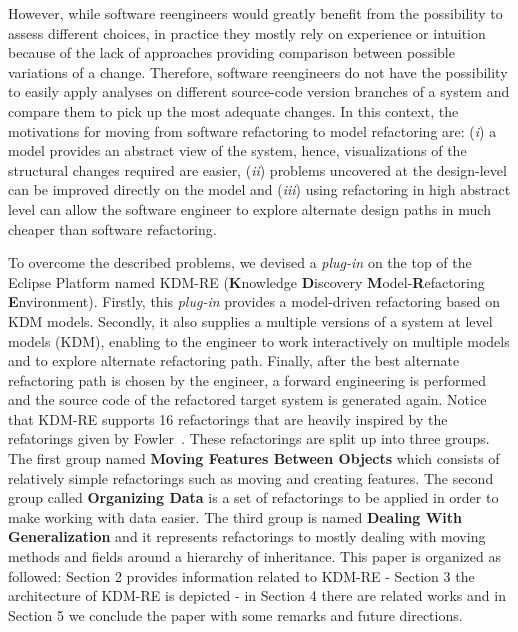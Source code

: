 However, while software reengineers would greatly benefit from the possibility to assess different choices, in practice they mostly rely on experience or intuition because of the lack of approaches providing comparison between possible variations of a change. 
Therefore, software reengineers do not have the possibility to easily apply analyses on different source-code version branches of a system and compare them to pick up the most adequate changes. In this context, the motivations for moving from software refactoring  to model refactoring are: 
(\textit{i}) a model provides an abstract view of the system, hence, visualizations of the structural changes required are easier, 
(\textit{ii}) problems uncovered at the design-level can be improved directly on the model and 
(\textit{iii}) using refactoring in high abstract level can allow the software engineer to explore alternate design paths in much cheaper than software refactoring.

To overcome the described problems, we devised a \textit{plug-in} on the top of the Eclipse Platform named KDM-RE (\textbf{K}nowledge \textbf{D}iscovery \textbf{M}odel-\textbf{R}efactoring \textbf{E}nvironment). Firstly, this \textit{plug-in} provides a model-driven refactoring based on KDM models. Secondly, it also supplies a multiple versions of a system at level models (KDM), enabling to the engineer  to work interactively on multiple models and to explore alternate refactoring path. Finally, after the best alternate refactoring path is chosen by the engineer, a forward engineering is performed and the source code of the refactored target system is generated again. Notice that KDM-RE supports 16 refactorings that are heavily inspired by the refatorings given by Fowler~\cite{aqui}. These refactorings are split up into three groups. The first group named \textbf{Moving Features Between Objects} which consists of relatively simple refactorings such as moving and creating features. The second group called \textbf{Organizing Data} is a set of refactorings to be applied in order to make working with data easier. The third group is named \textbf{Dealing With Generalization} and it represents refactorings to mostly dealing with moving methods and fields around a hierarchy of inheritance. This paper is organized as followed: Section 2 provides information related to KDM-RE - Section 3 the architecture of KDM-RE is depicted - in Section 4 there are related works and in Section 5 we conclude the paper with some remarks and future directions.





